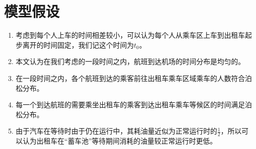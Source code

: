 \documentclass{cumcm}
\begin{document}
\section{模型假设}
\begin{enumerate}
	\item 考虑到每个人上车的时间相差较小，可以认为每个人从乘车区上车到出租车起步离开的时间固定，我们记这个时间为$t_0$。
	\item 本文认为在我们考虑的一段时间之内，航班到达机场的时间分布是均匀的。
	\item 在一段时间之内，各个航班到达的乘客前往出租车乘车区域乘车的人数符合泊松分布。
	\item 每一个到达航班的需要乘坐出租车的乘客到达出租车乘车等候区的时间满足泊松分布。
	\item 由于汽车在等待时由于仍在运行中，其耗油量近似为正常运行时的$\frac{1}{2}$，所以可以认为出租车在“蓄车池”等待期间消耗的油量较正常运行时更低。
\end{enumerate}

\newcommand{\flightnum}{$N_f$}
\newcommand{\taxinum}{$N_c$}
\newcommand{\waittime}{$t_w$}
\end{document}
